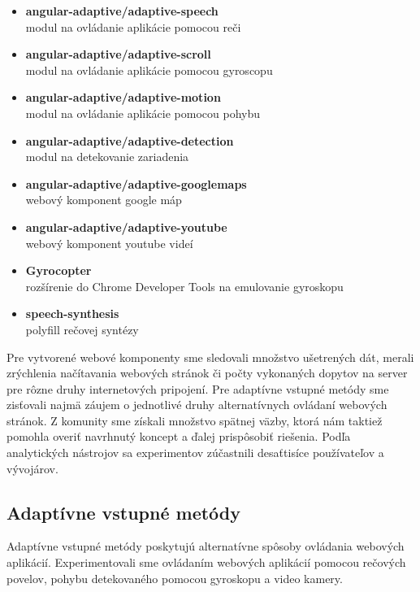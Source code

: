 \begin{itemize}
  \item \textbf{angular-adaptive/adaptive-speech}\\
    modul na ovládanie aplikácie pomocou reči
  \item \textbf{angular-adaptive/adaptive-scroll}\\
    modul na ovládanie aplikácie pomocou gyroscopu
  \item \textbf{angular-adaptive/adaptive-motion}\\
    modul na ovládanie aplikácie pomocou pohybu
  \item \textbf{angular-adaptive/adaptive-detection}\\
    modul na detekovanie zariadenia
  \item \textbf{angular-adaptive/adaptive-googlemaps}\\
    webový komponent google máp
  \item \textbf{angular-adaptive/adaptive-youtube}\\
    webový komponent youtube videí

  \item \textbf{Gyrocopter}\\
    rozšírenie do Chrome Developer Tools na emulovanie gyroskopu
  \item \textbf{speech-synthesis}\\
    polyfill rečovej syntézy
\end{itemize}

Pre vytvorené webové komponenty sme sledovali množstvo ušetrených dát, merali zrýchlenia načítavania webových stránok či počty vykonaných dopytov na server pre rôzne druhy internetových pripojení. Pre adaptívne vstupné metódy sme zisťovali najmä záujem o jednotlivé druhy alternatívnych ovládaní webových stránok. Z komunity sme získali množstvo spätnej väzby, ktorá nám taktiež pomohla overiť navrhnutý koncept a ďalej prispôsobiť riešenia. Podľa analytických nástrojov sa experimentov zúčastnili desaťtisíce používateľov a vývojárov.

\newpage
\subsection{Adaptívne vstupné metódy} %
\label{sub:adapt_vne_ovl_dacie_met_dy}

Adaptívne vstupné metódy poskytujú alternatívne spôsoby ovládania webových aplikácií. Experimentovali sme ovládaním webových aplikácií pomocou rečových povelov, pohybu detekovaného pomocou gyroskopu a video kamery.

